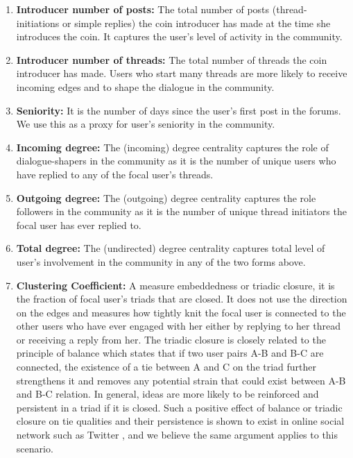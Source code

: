 \begin{enumerate}[topsep=0pt,itemsep=-0.5ex,partopsep=1ex,parsep=1ex]
  \item \textbf{Introducer number of posts:} The total number of posts (thread-initiations or simple replies) the coin introducer has made at the time she introduces the coin. It captures the user's level of activity in the community.
  \item \textbf{Introducer number of threads:} The total number of threads the coin introducer has made. Users who start many threads are more likely to receive incoming edges and to shape the dialogue in the community.
  \item \textbf{Seniority:} It is the number of days since the user's first post in the forums. We use this as a proxy for user's seniority in the community.
  \item \textbf{Incoming degree:} The (incoming) degree centrality captures the role of dialogue-shapers in the community as it is the number of unique users who have replied to any of the focal user's threads.
  \item \textbf{Outgoing degree:} The (outgoing) degree centrality captures the role followers in the community as it is the number of unique thread initiators the focal user has ever replied to.
  \item \textbf{Total degree:} The (undirected) degree centrality captures total level of user's involvement in the community in any of the two forms above.
  \item \textbf{Clustering Coefficient:} A measure embeddedness or triadic closure, it is the fraction of focal user's triads that are closed. It does not use the direction on the edges and measures how tightly knit the focal user is connected to the other users who have ever engaged with her either by replying to her thread or receiving a reply from her. The triadic closure is closely related to the principle of balance which states that if two user pairs A-B and B-C are connected, the existence of a tie between A and C on the triad further strengthens it and removes any potential strain that could exist between A-B and B-C relation. In general, ideas are more likely to be reinforced and persistent in a triad if it is closed. Such a positive effect of balance or triadic closure on tie qualities and their persistence is shown to exist in online social network such as Twitter \cite{KleinbergBalance}, and we believe the same argument applies to this scenario.

\end{enumerate}
